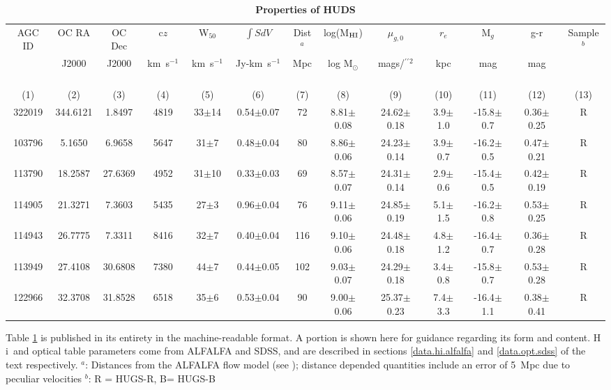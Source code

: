 \documentclass[twocolumn]{aastex6}
\def\kms{km~s$^{-1}$}
\def\arcsec{$^{\prime\prime}$}
\newcommand{\hi}{H{\sc\,i}}
\begin{document}
\begin{table}[]%
\caption{\textbf{Properties of HUDS}}
\vskip 5pt
\centering
\footnotesize{
\begin{tabular}{ccccccccccccc}
\hline
\hline
AGC ID & OC RA & OC Dec & c$z$    & W$_{50}$ & $\int SdV$ & Dist$^a$ & log(M$_{\rm HI}$) &    $\mu_{g,0}$      & $r_e$ & M$_g$ & g-r & Sample$^b$\\
              &  J2000 &  J2000  &  \kms\  & \kms\       &  Jy-\kms\    &Mpc &  log M$_{\odot}$  & mags/\arcsec$^2$ & kpc & mag   & mag  &    \\
      (1)    &  (2)       & (3)         &   (4)       &     (5)         &    (6)              &   (7) &            (8)                    &              (9)                & (10) & (11) & (12)  & (13) \\
\hline
322019 & 344.6121 & 1.8497 & 4819 & 33$\pm$14 & 0.54$\pm$0.07 & 72 & 8.81$\pm$0.08 & 24.62$\pm$0.18& 3.9$\pm$1.0 & -15.8$\pm$0.7 & 0.36$\pm$0.25 & R\\
103796 & 5.1650 & 6.9658 & 5647 & 31$\pm$7 & 0.48$\pm$0.04 & 80 & 8.86$\pm$0.06 & 24.23$\pm$0.14& 3.9$\pm$0.7 & -16.2$\pm$0.5 & 0.47$\pm$0.21 & R\\
113790 & 18.2587 & 27.6369 & 4952 & 31$\pm$10 & 0.33$\pm$0.03 & 69 & 8.57$\pm$0.07 & 24.31$\pm$0.14& 2.9$\pm$0.6 & -15.4$\pm$0.5 & 0.42$\pm$0.19 & R\\
114905 & 21.3271 & 7.3603 & 5435 & 27$\pm$3 & 0.96$\pm$0.04 & 76 & 9.11$\pm$0.06 & 24.85$\pm$0.19& 5.1$\pm$1.5 & -16.2$\pm$0.8 & 0.53$\pm$0.25 & R\\
114943 & 26.7775 & 7.3311 & 8416 & 32$\pm$7 & 0.40$\pm$0.04 & 116 & 9.10$\pm$0.06 & 24.48$\pm$0.18& 4.8$\pm$1.2 & -16.4$\pm$0.7 & 0.36$\pm$0.28 & R\\
113949 & 27.4108 & 30.6808 & 7380 & 44$\pm$7 & 0.44$\pm$0.05 & 102 & 9.03$\pm$0.07 & 24.29$\pm$0.18& 3.4$\pm$0.8 & -15.8$\pm$0.7 & 0.53$\pm$0.28 & R\\
122966 & 32.3708 & 31.8528 & 6518 & 35$\pm$6 & 0.53$\pm$0.04 & 90 & 9.00$\pm$0.06 & 25.37$\pm$0.23& 7.4$\pm$3.3 & -16.4$\pm$1.1 & 0.38$\pm$0.41 & R\\
\hline
\hline
\end{tabular}\label{maintable}
\begin{flushleft}
Table \ref{maintable} is published in its entirety in the machine-readable format. A portion is shown here for guidance regarding its form and content. \hi\ and optical table parameters come from ALFALFA and SDSS, and are described in sections \ref{data.hi.alfalfa} and \ref{data.opt.sdss} of the text respectively. $^a$: Distances from the ALFALFA flow model (see \citealp{haynes11a}); distance depended quantities include an error of 5~Mpc due to peculiar velocities $^b$: R = HUGS-R, B= HUGS-B
\end{flushleft}
}%
\end{table}
\end{document}
